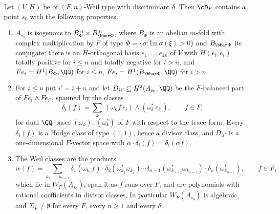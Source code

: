 \begin{theorem}
\label{thm:cmbasepoint}
Let $(V,H)$ be of $(F,n)$-Weil type with discriminant $\delta$. Then $\cD_{F}$
contains a point $s_{0}$ with the following properties.
\begin{enumerate}[label=\textup{(\roman*)},leftmargin=2.6em,itemsep=2pt]
\item $A_{s_{0}}$ is isogenous to $B_{\Phi}^{\,n}\times B_{\bbar\Phi}^{\,n}$,
  where $B_{\Phi}$ is an abelian $m$-fold with complex multiplication by $F$
  of type $\Phi=\{\sigma:\mathrm{Im}\,\sigma(\xi)>0\}$ and $B_{\bbar\Phi}$ its
  conjugate; there is an $H$-orthogonal basis $e_{1},\dots,e_{2n}$ of $V$
  with $H(e_{i},e_{i})$ totally positive for $i\le n$ and totally negative
  for $i>n$, and $Fe_{i}=H^{1}(B_{\Phi},\QQ)$ for $i\le n$,
  $Fe_{i}=H^{1}(B_{\bbar\Phi},\QQ)$ for $i>n$.
\item For $i\le n$ put $i'=i+n$ and let $D_{ii'}\subseteq H^{2}(A_{s_{0}},\QQ)$
  be the $F$-balanced part of $Fe_{i}\wedge Fe_{i'}$, spanned by the classes
  \[
    \delta_{i}(f)=\sum_{k}\,(\omega_{k}f\,e_{i})\wedge(\omega_{k}^{*}\,e_{i'}),
    \qquad f\in F,
  \]
  for dual $\QQ$-bases $(\omega_{k})$, $(\omega_{k}^{*})$ of $F$ with respect
  to the trace form. Every $\delta_{i}(f)$ is a Hodge class of type $(1,1)$,
  hence a divisor class, and $D_{ii'}$ is a one-dimensional $F$-vector space
  with $\alpha\cdot\delta_{i}(f)=\delta_{i}(\alpha f)$.
\item The Weil classes are the products
  \[
    w(f)=\sum_{k_{1},\dots,k_{n-1}}
      \delta_{1}(\omega_{k_{1}}f)\cdot\delta_{2}(\omega_{k_{1}}^{*}\omega_{k_{2}})
      \cdots\delta_{n-1}(\omega_{k_{n-2}}^{*}\omega_{k_{n-1}})\cdot
      \delta_{n}(\omega_{k_{n-1}}^{*}),\qquad f\in F,
  \]
  which lie in $W_{F}(A_{s_{0}})$, span it as $f$ runs over $F$, and are
  polynomials with rational coefficients in divisor classes. In particular
  $W_{F}(A_{s_{0}})$ is algebraic, and $\Sigma_{F}\ne\emptyset$ for every $F$,
  every $n\ge1$ and every $\delta$.
\end{enumerate}
\end{theorem}

